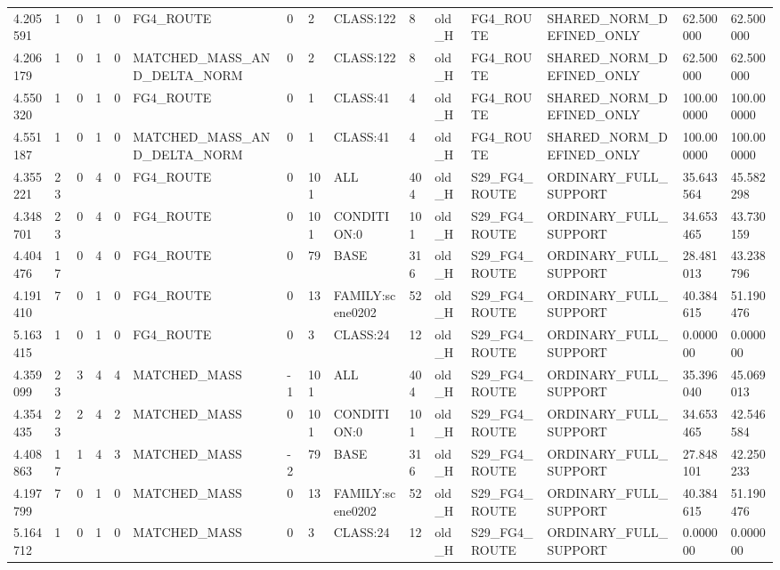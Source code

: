 \begin{tabular}{lllllllllllllll}
4.205591 & 1 & 0 & 1 & 0 & FG4\_ROUTE & 0 & 2 & CLASS:122 & 8 & old\_H & FG4\_ROUTE & SHARED\_NORM\_DEFINED\_ONLY & 62.500000 & 62.500000 \\
4.206179 & 1 & 0 & 1 & 0 & MATCHED\_MASS\_AND\_DELTA\_NORM & 0 & 2 & CLASS:122 & 8 & old\_H & FG4\_ROUTE & SHARED\_NORM\_DEFINED\_ONLY & 62.500000 & 62.500000 \\
4.550320 & 1 & 0 & 1 & 0 & FG4\_ROUTE & 0 & 1 & CLASS:41 & 4 & old\_H & FG4\_ROUTE & SHARED\_NORM\_DEFINED\_ONLY & 100.000000 & 100.000000 \\
4.551187 & 1 & 0 & 1 & 0 & MATCHED\_MASS\_AND\_DELTA\_NORM & 0 & 1 & CLASS:41 & 4 & old\_H & FG4\_ROUTE & SHARED\_NORM\_DEFINED\_ONLY & 100.000000 & 100.000000 \\
4.355221 & 23 & 0 & 4 & 0 & FG4\_ROUTE & 0 & 101 & ALL & 404 & old\_H & S29\_FG4\_ROUTE & ORDINARY\_FULL\_SUPPORT & 35.643564 & 45.582298 \\
4.348701 & 23 & 0 & 4 & 0 & FG4\_ROUTE & 0 & 101 & CONDITION:0 & 101 & old\_H & S29\_FG4\_ROUTE & ORDINARY\_FULL\_SUPPORT & 34.653465 & 43.730159 \\
4.404476 & 17 & 0 & 4 & 0 & FG4\_ROUTE & 0 & 79 & BASE & 316 & old\_H & S29\_FG4\_ROUTE & ORDINARY\_FULL\_SUPPORT & 28.481013 & 43.238796 \\
4.191410 & 7 & 0 & 1 & 0 & FG4\_ROUTE & 0 & 13 & FAMILY:scene0202 & 52 & old\_H & S29\_FG4\_ROUTE & ORDINARY\_FULL\_SUPPORT & 40.384615 & 51.190476 \\
5.163415 & 1 & 0 & 1 & 0 & FG4\_ROUTE & 0 & 3 & CLASS:24 & 12 & old\_H & S29\_FG4\_ROUTE & ORDINARY\_FULL\_SUPPORT & 0.000000 & 0.000000 \\
4.359099 & 23 & 3 & 4 & 4 & MATCHED\_MASS & -1 & 101 & ALL & 404 & old\_H & S29\_FG4\_ROUTE & ORDINARY\_FULL\_SUPPORT & 35.396040 & 45.069013 \\
4.354435 & 23 & 2 & 4 & 2 & MATCHED\_MASS & 0 & 101 & CONDITION:0 & 101 & old\_H & S29\_FG4\_ROUTE & ORDINARY\_FULL\_SUPPORT & 34.653465 & 42.546584 \\
4.408863 & 17 & 1 & 4 & 3 & MATCHED\_MASS & -2 & 79 & BASE & 316 & old\_H & S29\_FG4\_ROUTE & ORDINARY\_FULL\_SUPPORT & 27.848101 & 42.250233 \\
4.197799 & 7 & 0 & 1 & 0 & MATCHED\_MASS & 0 & 13 & FAMILY:scene0202 & 52 & old\_H & S29\_FG4\_ROUTE & ORDINARY\_FULL\_SUPPORT & 40.384615 & 51.190476 \\
5.164712 & 1 & 0 & 1 & 0 & MATCHED\_MASS & 0 & 3 & CLASS:24 & 12 & old\_H & S29\_FG4\_ROUTE & ORDINARY\_FULL\_SUPPORT & 0.000000 & 0.000000 \\

\end{tabular}
